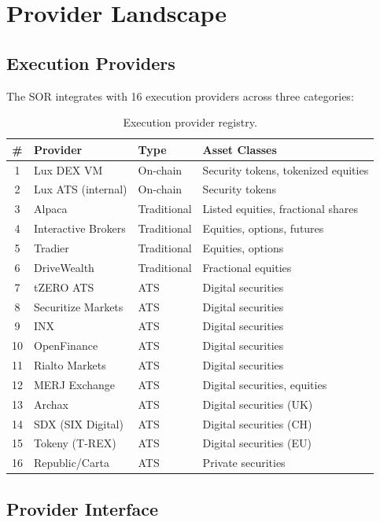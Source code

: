 \section{Provider Landscape}
\label{sec:providers}

\subsection{Execution Providers}

The SOR integrates with 16 execution providers across three categories:

\begin{table}[H]
\centering
\caption{Execution provider registry.}
\label{tab:providers}
\begin{tabular}{clll}
\toprule
\textbf{\#} & \textbf{Provider} & \textbf{Type} & \textbf{Asset Classes} \\
\midrule
1 & Lux DEX VM & On-chain & Security tokens, tokenized equities \\
2 & Lux ATS (internal) & On-chain & Security tokens \\
3 & Alpaca & Traditional & Listed equities, fractional shares \\
4 & Interactive Brokers & Traditional & Equities, options, futures \\
5 & Tradier & Traditional & Equities, options \\
6 & DriveWealth & Traditional & Fractional equities \\
7 & tZERO ATS & ATS & Digital securities \\
8 & Securitize Markets & ATS & Digital securities \\
9 & INX & ATS & Digital securities \\
10 & OpenFinance & ATS & Digital securities \\
11 & Rialto Markets & ATS & Digital securities \\
12 & MERJ Exchange & ATS & Digital securities, equities \\
13 & Archax & ATS & Digital securities (UK) \\
14 & SDX (SIX Digital) & ATS & Digital securities (CH) \\
15 & Tokeny (T-REX) & ATS & Digital securities (EU) \\
16 & Republic/Carta & ATS & Private securities \\
\bottomrule
\end{tabular}
\end{table}

\subsection{Provider Interface}

